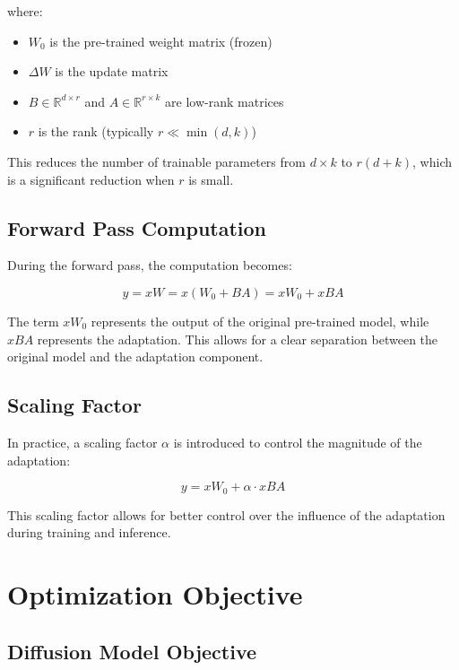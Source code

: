 \documentclass{article}
\begin{document}
where:
\begin{itemize}
    \item $W_0$ is the pre-trained weight matrix (frozen)
    \item $\Delta W$ is the update matrix
    \item $B \in \mathbb{R}^{d \times r}$ and $A \in \mathbb{R}^{r \times k}$ are low-rank matrices
    \item $r$ is the rank (typically $r \ll \min(d, k)$)
\end{itemize}

This reduces the number of trainable parameters from $d \times k$ to $r(d + k)$, which is a significant reduction when $r$ is small.

\subsection{Forward Pass Computation}

During the forward pass, the computation becomes:

\begin{equation}
y = xW = x(W_0 + BA) = xW_0 + xBA
\end{equation}

The term $xW_0$ represents the output of the original pre-trained model, while $xBA$ represents the adaptation. This allows for a clear separation between the original model and the adaptation component.

\subsection{Scaling Factor}

In practice, a scaling factor $\alpha$ is introduced to control the magnitude of the adaptation:

\begin{equation}
y = xW_0 + \alpha \cdot xBA
\end{equation}

This scaling factor allows for better control over the influence of the adaptation during training and inference.

\section{Optimization Objective}

\subsection{Diffusion Model Objective}
\end{document}
